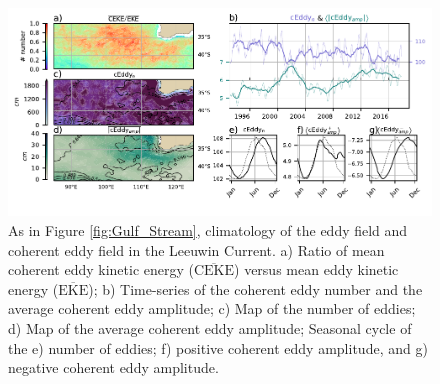 \documentclass[draft,linenumbers]{agujournal2019}
\newcommand{\MEKE}{\overline{\textrm{EKE}}}
\newcommand{\EKE}{\textrm{EKE}}
\newcommand{\MCEKE}{\overline{\textrm{CEKE}}}
\begin{document}
	
	\begin{figure}
	    \centering
	    \includegraphics[width=1\textwidth]{figures/regional_ratios_and_stats_V3_0.pdf}
	    \caption{As in Figure \ref{fig:Gulf_Stream}, climatology of the eddy field and coherent eddy field in the Leeuwin Current. a) Ratio of mean coherent eddy kinetic energy ($\MCEKE$) versus mean eddy kinetic energy ($\MEKE$); b) Time-series of the coherent eddy number and the average coherent eddy amplitude; c) Map of the number of eddies; d) Map of the average coherent eddy amplitude; Seasonal cycle of the e) number of eddies; f) positive coherent eddy amplitude, and g) negative coherent eddy amplitude.}
	    \label{fig:leeuwin_cycle}
	\end{figure}
\end{document}
